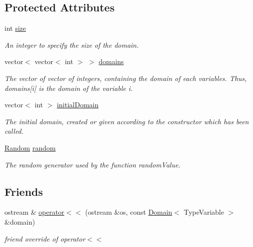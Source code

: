 \subsection*{Protected Attributes}
\begin{DoxyCompactItemize}
\item 
int \hyperlink{classghost_1_1Domain_a13e282f60c6c7cddf5b5716b45ad161c}{size}
\begin{DoxyCompactList}\small\item\em An integer to specify the size of the domain. \end{DoxyCompactList}\item 
vector$<$ vector$<$ int $>$ $>$ \hyperlink{classghost_1_1Domain_a6940f37aa773c6c94cff18cfe1e6a7f7}{domains}
\begin{DoxyCompactList}\small\item\em The vector of vector of integers, containing the domain of each variables. Thus, domains\mbox{[}i\mbox{]} is the domain of the variable i. \end{DoxyCompactList}\item 
vector$<$ int $>$ \hyperlink{classghost_1_1Domain_a8890ca1323c293a4a1e2aa1830eff043}{initial\-Domain}
\begin{DoxyCompactList}\small\item\em The initial domain, created or given according to the constructor which has been called. \end{DoxyCompactList}\item 
\hyperlink{classghost_1_1Random}{Random} \hyperlink{classghost_1_1Domain_ab6a7a58f8a147f5b2b475e106627fad2}{random}
\begin{DoxyCompactList}\small\item\em The random generator used by the function random\-Value. \end{DoxyCompactList}\end{DoxyCompactItemize}
\subsection*{Friends}
\begin{DoxyCompactItemize}
\item 
ostream \& \hyperlink{classghost_1_1Domain_a73846a35a1024305520654677c9beb02}{operator$<$$<$} (ostream \&os, const \hyperlink{classghost_1_1Domain}{Domain}$<$ Type\-Variable $>$ \&domain)
\begin{DoxyCompactList}\small\item\em friend override of operator$<$$<$ \end{DoxyCompactList}\end{DoxyCompactItemize}


